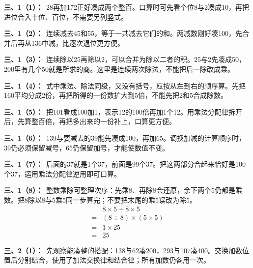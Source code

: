 \documentclass[multi=snippet,border=0pt]{standalone}
\newenvironment{snippet}[3]{\begin{minipage}{#1bp}\color{answerred}\fontsize{#2}{#3}\selectfont\raggedright}{\end{minipage}}
\begin{document}
\begin{snippet}{505}{11.5}{14}\textbf{三、1（1）：}\ 28再加172正好凑成两个整百。口算时可先看个位8与2凑成10，再把进位合入十位、百位，不需要另列竖式。\end{snippet}
\begin{snippet}{505}{11.5}{14}\textbf{三、1（2）：}\ 连续减去45和55，等于一共减去它们的和。两减数刚好凑100，先合并后再从136中减，比逐次退位更方便。\end{snippet}
\begin{snippet}{505}{11.5}{14}\textbf{三、1（3）：}\ 连续除以25再除以2，可以合并为除以二者的积。25与2先凑成50，200里有几个50就是所求的商。这里是连续两次除法，不能把后一除改成乘。\end{snippet}
\begin{snippet}{505}{11.5}{14}\textbf{三、1（4）：}\ 式中乘法、除法同级，又没有括号，应按从左到右的顺序算。先把160平均分成2份，再把所得的一份数扩大到5倍，不能先把2和5合成除数。\end{snippet}
\begin{snippet}{505}{11.5}{14}\textbf{三、1（5）：}\ 把101看成100加1，表示12的100倍再加1个12。用乘法分配律拆开后，先算整百倍，再把多出来的一份补上，口算更方便。\end{snippet}
\begin{snippet}{505}{11.5}{14}\textbf{三、1（6）：}\ 139与要减去的39能先凑成100，再加65。调换加减的计算顺序时，39仍必须保留减号，65仍保留加号，才能使数值不变。\end{snippet}
\begin{snippet}{505}{11.5}{14}\textbf{三、1（7）：}\ 后面的37就是1个37，前面是99个37。把这两部分合起来恰好是100个37，运用乘法分配律逆用即可口算。\end{snippet}
\begin{snippet}{505}{11.5}{14}\textbf{三、1（8）：}\ 整数乘除可整理次序：先乘8、再除8会还原，余下两个5仍都是乘数。把8除以8与5乘5同一步算完；不要把末尾的乘5误改为除5。\[\begin{aligned}&8\times5\div8\times5\\={}&(8\div8)\times(5\times5)\\={}&1\times25\\={}&25\end{aligned}\]\end{snippet}
\begin{snippet}{505}{11.5}{14}\textbf{三、2（1）：}\ 先观察能凑整的搭配：138与62凑200，293与107凑400。交换加数位置后分别结合，使用了加法交换律和结合律；所有加数仍各用一次。\end{snippet}
\end{document}
